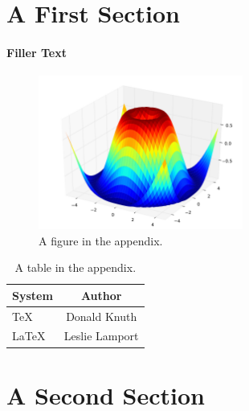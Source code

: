 
\section{A First Section}

\paragraph{Filler Text} \lipsum[1-6]
%
\begin{figure}
  \centering
  \includegraphics[width=0.6\textwidth]{Chapter-2/figs/threed}
  \caption{A figure in the appendix.}
  \label{fig:app}
\end{figure}
%
\lipsum[7-10]
\begin{table}
  \caption{A table in the appendix.}
  \label{tab:app}
  \begin{center}
    \begin{tabular}{lc}
      \toprule
      System & Author \\
      \midrule
      \TeX   & Donald Knuth   \\
      \LaTeX & Leslie Lamport \\
      \bottomrule
    \end{tabular}
  \end{center}
\end{table}
%

\section{A Second Section}

\lipsum[14-15]
